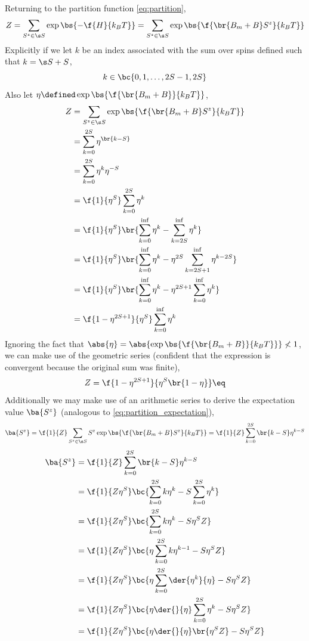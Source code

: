 \documentclass{article}
\begin{document}
Returning to the partition function \cref{eq:partition},
\[ Z = \sum_{S^z \in \s S} \exp\bs{-\f{H}{k_BT}} = \sum_{S^z \in \s S} \exp\bs{\f{\br{B_m + B} S^{z}}{k_BT}} \]
Explicitly if we let $k$ be an index associated with the sum over spins defined such that $k = \s S + S$,
\[ k \in \bc{0, 1, \ldots, 2S - 1, 2S} \]
Also let $\eta \defined \exp\bs{\f{\br{B_m + B}}{k_BT}}$,
\begin{align*}
Z
&= \sum_{S^z \in \s S} \exp\bs{\f{\br{B_m + B} S^{z}}{k_BT}} \\
&= \sum_{k = 0}^{2S} \eta^{\br{k - S}} \\
&= \sum_{k = 0}^{2S} \eta^{k} \eta^{-S} \\
&= \f{1}{\eta^{S}}\sum_{k = 0}^{2S} \eta^{k} \\
&= \f{1}{\eta^{S}}\br{\sum_{k = 0}^{\inf} \eta^{k} - \sum_{k = 2S}^{\inf} \eta^{k}} \\
&= \f{1}{\eta^{S}}\br{\sum_{k = 0}^{\inf} \eta^{k} - \eta^{2S}\sum_{k = 2S+1}^{\inf} \eta^{k - 2S}} \\
&= \f{1}{\eta^{S}}\br{\sum_{k = 0}^{\inf} \eta^{k} - \eta^{2S+1}\sum_{k = 0}^{\inf} \eta^{k}} \\
&= \f{1- \eta^{2S+1}}{\eta^{S}}\sum_{k = 0}^{\inf} \eta^{k}
\end{align*}
Ignoring the fact that $\abs{\eta} = \abs{\exp\bs{\f{\br{B_m + B}}{k_BT}}} \not < 1$, we can make use of the geometric series (confident that the expression is convergent because the original sum was finite),
\[ Z = \f{1- \eta^{2S+1}}{\eta^{S}\br{1 - \eta}} \eq \label{eq:derivative} \]
Additionally we may make use of an arithmetic series to derive the expectation value $\ba{S^{z}}$ (analogous to \cref{eq:partition_expectation}),
\[ \ba{S^z} = \f{1}{Z} \sum_{S^z \in \s S} S^z \exp\bs{\f{\br{B_m + B} S^{z}}{k_BT}} = \f{1}{Z} \sum_{k = 0}^{2S} \br{k - S} \eta^{k - S}\]
\begin{align*}
    \ba{S^z}
    &= \f{1}{Z} \sum_{k = 0}^{2S} \br{k - S} \eta^{k - S} \\
    &= \f{1}{Z\eta^{S}} \bc{\sum_{k = 0}^{2S} k \eta^{k} - S\sum_{k = 0}^{2S} \eta^{k}} \\
    &= \f{1}{Z\eta^{S}} \bc{\sum_{k = 0}^{2S} k \eta^{k} - S \eta^{S} Z} \\
    &= \f{1}{Z\eta^{S}} \bc{\eta\sum_{k = 0}^{2S} k \eta^{k-1} - S\eta^{S}Z} \\
    &= \f{1}{Z\eta^{S}} \bc{\eta\sum_{k = 0}^{2S} \der{\eta^{k}}{\eta} - S\eta^{S}Z} \\
    &= \f{1}{Z\eta^{S}} \bc{\eta\der{}{\eta}\sum_{k = 0}^{2S} \eta^{k} - S\eta^{S}Z} \\
    &= \f{1}{Z\eta^{S}} \bc{\eta\der{}{\eta}\br{\eta^{S}Z} - S\eta^{S}Z}
\end{align*}
\end{document}
